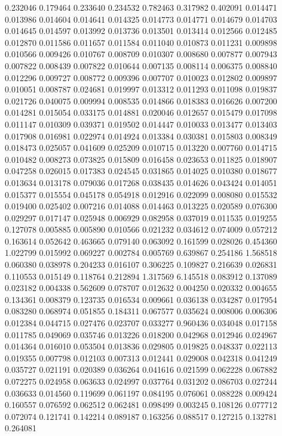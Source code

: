 0.232046
0.179464
0.233640
0.234532
0.782463
0.317982
0.402091
0.014471
0.013986
0.014604
0.014641
0.014325
0.014773
0.014771
0.014679
0.014703
0.014645
0.014597
0.013992
0.013736
0.013501
0.013414
0.012566
0.012485
0.012870
0.011586
0.011657
0.011584
0.011040
0.010873
0.011231
0.009898
0.010566
0.009426
0.010767
0.008709
0.010307
0.008680
0.007877
0.007943
0.007822
0.008439
0.007822
0.010644
0.007135
0.008114
0.006375
0.008840
0.012296
0.009727
0.008772
0.009396
0.007707
0.010023
0.012802
0.009897
0.010051
0.008787
0.024681
0.019997
0.013312
0.011293
0.011098
0.019837
0.021726
0.040075
0.009994
0.008535
0.014866
0.018383
0.016626
0.007200
0.014281
0.015054
0.033175
0.014881
0.020046
0.012657
0.015479
0.017098
0.011147
0.010309
0.039371
0.019502
0.014447
0.010033
0.013477
0.013403
0.017908
0.016981
0.022974
0.014924
0.013384
0.030381
0.015803
0.008349
0.018473
0.025057
0.041609
0.025209
0.010715
0.013220
0.007760
0.014715
0.010482
0.008273
0.073825
0.015809
0.016458
0.023653
0.011825
0.018907
0.047258
0.026015
0.017383
0.024545
0.031865
0.014025
0.010380
0.018677
0.013634
0.013178
0.079036
0.017268
0.038435
0.014626
0.043424
0.014051
0.015377
0.015554
0.045178
0.054918
0.012916
0.022099
0.008080
0.015532
0.019400
0.025402
0.007216
0.014088
0.014463
0.013225
0.020589
0.076300
0.029297
0.017147
0.025948
0.006929
0.082958
0.037019
0.011535
0.019255
0.127078
0.005885
0.005890
0.010566
0.021232
0.034612
0.074009
0.057212
0.163614
0.052642
0.463665
0.079140
0.063092
0.161599
0.028026
0.454360
1.022799
0.015992
0.069227
0.002784
0.005769
0.639867
0.254186
1.568518
0.060380
0.038978
0.204233
0.016107
0.306225
0.109827
0.216639
0.026831
0.110553
0.015149
0.118764
0.212894
1.317569
6.145518
0.083912
0.137089
0.023182
0.004338
0.562609
0.078707
0.012632
0.004250
0.020332
0.004655
0.134361
0.008379
0.123735
0.016534
0.009661
0.036138
0.034287
0.017954
0.083280
0.068974
0.051855
0.184311
0.067577
0.035624
0.008006
0.006306
0.012384
0.044715
0.027476
0.023707
0.033277
0.960436
0.034048
0.017158
0.011785
0.049069
0.035746
0.013226
0.018200
0.042968
0.012946
0.024967
0.014364
0.016010
0.053504
0.013836
0.029805
0.019825
0.048337
0.022113
0.019355
0.007798
0.012103
0.007313
0.012441
0.029008
0.042318
0.041249
0.035727
0.021191
0.020389
0.036264
0.041616
0.021599
0.062228
0.067882
0.072275
0.024958
0.063633
0.024997
0.037764
0.031202
0.086703
0.027244
0.036633
0.014560
0.119699
0.061197
0.084195
0.076061
0.088228
0.009424
0.160557
0.076592
0.062512
0.062481
0.098499
0.003245
0.108126
0.077712
0.072074
0.121741
0.142214
0.089187
0.163256
0.088517
0.127215
0.132781
0.264081
